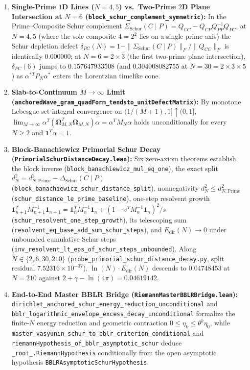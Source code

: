 \documentclass[11pt,a4paper]{article}
\theoremstyle{definition}
\begin{document}
\begin{enumerate}[leftmargin=1.8em,itemsep=2pt]
\item \textbf{Single-Prime $1$D Lines ($N=4,5$) vs.\ Two-Prime $2$D Plane Intersection at $N=6$ (\texttt{block\_schur\_complement\_symmetric}):} In the Prime--Composite Schur complement $\Sigma_{\mathrm{Schur}}(C \mid P) = Q_{CC} - Q_{CP} Q_{PP}^{-1} Q_{PC}$, at $N=4,5$ (where the sole composite $4 = 2^2$ lies on a single prime axis) the Schur depletion defect $\delta_{PC}(N) = 1 - \|\Sigma_{\mathrm{Schur}}(C\mid P)\|_F / \|Q_{CC}\|_F$ is identically $0.000000$; at $N = 6 = 2 \times 3$ (the first two-prime plane intersection), $\delta_{PC}(6)$ jumps to $0.157647933508$ (and $0.304008082755$ at $N = 30 = 2 \times 3 \times 5$) as $\alpha^{*T} P_N \alpha^*$ enters the Lorentzian timelike cone.
\item \textbf{Slab-to-Continuum $M\to\infty$ Limit (\texttt{anchoredWave\_gram\_quadForm\_tendsto\_unitDefectMatrix}):} By monotone Lebesgue set-integral convergence on $(1/(M+1), 1] \uparrow (0, 1]$, $\lim_{M\to\infty} \alpha^T (\mathbf{\Omega}_{M,N}^T \mathbf{\Omega}_{M,N})\alpha = \alpha^T M_N \alpha$ holds unconditionally for every $N \ge 2$ and $\mathbf{1}^T\alpha = 1$.
\item \textbf{Block-Banachiewicz Primorial Schur Decay (\texttt{PrimorialSchurDistanceDecay.lean}):} Six zero-axiom theorems establish the block inverse (\texttt{block\_banachiewicz\_mul\_eq\_one}), the exact split $d_N^2 = d_{N,\mathrm{Prime}}^2 - \Delta_{\mathrm{Schur}}(C \mid P)$ (\texttt{block\_banachiewicz\_schur\_distance\_split}), nonnegativity $d_N^2 \le d_{N,\mathrm{Prime}}^2$ (\texttt{schur\_distance\_le\_prime\_baseline}), one-step resolvent growth $\mathbf{1}_{n+1}^T M_{n+1}^{-1}\mathbf{1}_{n+1} = \mathbf{1}_n^T M_n^{-1}\mathbf{1}_n + (1 - v^T M_n^{-1}\mathbf{1}_n)^2/s$ (\texttt{schur\_resolvent\_one\_step\_growth}), its telescoping sum (\texttt{resolvent\_eq\_base\_add\_sum\_schur\_steps}), and $E_{\mathrm{dir}}(N) \to 0$ under unbounded cumulative Schur steps (\texttt{inv\_resolvent\_lt\_eps\_of\_schur\_steps\_unbounded}). Along $N \in \{2, 6, 30, 210\}$ (\texttt{probe\_primorial\_schur\_distance\_decay.py}, split residual $7.52316\times 10^{-37}$), $\ln(N)\cdot E_{\mathrm{dir}}(N)$ descends to $0.04748453$ at $N=210$ against $2+\gamma-\ln(4\pi) = 0.04619142$.
\item \textbf{End-to-End Master BBLR Bridge (\texttt{RiemannMasterBBLRBridge.lean}):} \texttt{dirichlet\_anchored\_schur\_energy\_reduction\_unconditional} and \texttt{bblr\_logarithmic\_envelope\_excess\_decay\_unconditional} formalize the finite-$N$ energy reduction and geometric contraction $0 \le \eta_k \le \theta^k \eta_0$, while \texttt{master\_vasyunin\_schur\_to\_bblr\_criterion\_conditional} and \texttt{riemannHypothesis\_of\_bblr\_asymptotic\_schur} deduce \texttt{\_root\_.RiemannHypothesis} conditionally from the open asymptotic hypothesis \texttt{BBLRAsymptoticSchurHypothesis}.
\end{enumerate}
\end{document}
